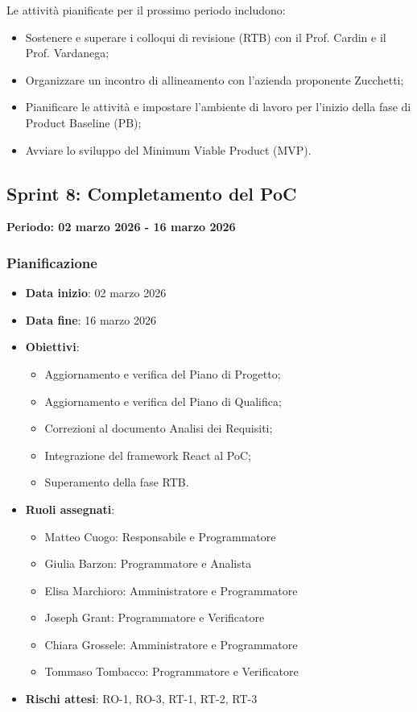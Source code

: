 \documentclass[11pt,a4paper]{article}
\begin{document}
Le attività pianificate per il prossimo periodo includono:
\begin{itemize}
    \item Sostenere e superare i colloqui di revisione (RTB) con il Prof. Cardin e il Prof. Vardanega;
    \item Organizzare un incontro di allineamento con l'azienda proponente Zucchetti;
    \item Pianificare le attività e impostare l'ambiente di lavoro per l'inizio della fase di Product Baseline (PB);
    \item Avviare lo sviluppo del Minimum Viable Product (MVP).
\end{itemize}
\newpage
\subsection{Sprint 8: Completamento del PoC}
{\textbf{Periodo: 02 marzo 2026 - 16 marzo 2026}\par}

\subsubsection{Pianificazione}
\begin{itemize}
    \item \textbf{Data inizio}: 02 marzo 2026
    \item \textbf{Data fine}: 16 marzo 2026
    \item \textbf{Obiettivi}:
    \begin{itemize}
        \item Aggiornamento e verifica del Piano di Progetto;
        \item Aggiornamento e verifica del Piano di Qualifica;
        \item Correzioni al documento Analisi dei Requisiti;
        \item Integrazione del framework React al PoC;
        \item Superamento della fase RTB.
        
    \end{itemize}
    \item \textbf{Ruoli assegnati}:
    \begin{itemize}
        \item Matteo Cuogo: Responsabile e Programmatore
        \item Giulia Barzon: Programmatore e Analista
        \item Elisa Marchioro: Amministratore e Programmatore
        \item Joseph Grant: Programmatore e Verificatore
        \item Chiara Grossele: Amministratore e Programmatore
        \item Tommaso Tombacco: Programmatore e Verificatore
    \end{itemize}
    \item \textbf{Rischi attesi}: RO-1, RO-3, RT-1, RT-2, RT-3
\end{itemize}
\end{document}

